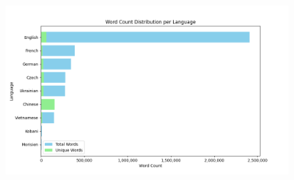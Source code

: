 \documentclass[aspectratio=169]{beamer}
\begin{document}
\begin{frame}[fragile]
\begin{figure}
\begin{overprint}
             \includegraphics[height=6.3cm]{images/mtacr-2024-april-all.png} 
        \end{overprint}
        
    \end{figure}
\end{frame}




\end{document}
